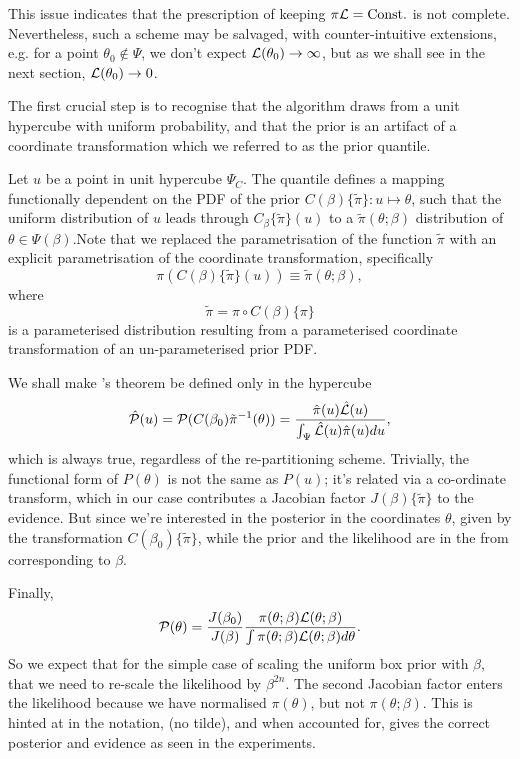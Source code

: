 \documentclass[usenatbib]{mnras}
\begin{document}
This issue indicates that the prescription of keeping \(\pi {\cal
	L} = \text{Const.}\) is not complete. Nevertheless, such a scheme
may be salvaged, with counter-intuitive extensions, e.g. for a
point \(\theta_{0} \notin \Psi\), we don't expect \({\cal
	L}(\theta_{0}) \rightarrow \infty\), but as we shall see in the
next section, \({\cal L}(\theta_{0}) \rightarrow 0\).

The first crucial step is to recognise that the algorithm draws
from a unit hypercube with uniform probability, and that the prior
is an artifact of a coordinate transformation which we referred to
as the prior quantile.

Let \(u\) be a point in unit hypercube \(\Psi_{C}\). The quantile
defines a mapping functionally dependent on the PDF of the prior
\(C(\beta)\lbrace \tilde{\pi}\rbrace:u \mapsto \theta\), such that
the uniform distribution of \(u\) leads through
\(C_{\beta}\{\tilde{\pi}\}(u)\) to a \(\tilde{\pi}(\theta;\beta)\)
distribution of \(\theta \in\Psi(\beta)\).Note that we replaced the
parametrisation of the function \(\tilde{\pi}\) with an explicit
parametrisation of the coordinate transformation, specifically
\begin{equation}
  \pi(C(\beta)\{\tilde{\pi}\}(u)) \equiv \tilde{\pi}(\theta; \beta),
\end{equation}
where 
\begin{equation}
  \tilde{\pi} =  \pi \circ C(\beta) \{ \pi \} 
\end{equation}
is a parameterised distribution resulting from a parameterised
coordinate transformation of an un-parameterised prior PDF.

We shall make \citeauthor{1763} 's theorem be defined only in the
hypercube
\begin{equation}
{\cal \hat{P}}(u) = {\cal P}(C(\beta_{0}){\tilde{\pi}}^{-1}(\theta)) = \frac{\hat{\pi} (u) {\cal \hat{L}}(u)}{\int_{\Psi}{\cal \hat{L}}(u) \hat{\pi}(u) du},
\end{equation}
which is always true, regardless of the re-partitioning
scheme. Trivially, the functional form of \(P(\theta)\) is not the same
as \(P(u)\); it's related via a co-ordinate transform, which in our
case contributes a Jacobian factor \(J(\beta)\{\tilde{\pi}\}\) to the
evidence. But since we're interested in the posterior in the
coordinates \(\theta\), given by the transformation \(C(\beta_{0})\{\tilde{\pi}\}\),
while the prior and the likelihood are in the from corresponding
to \(\beta\).

Finally, 
\begin{equation}
 {\cal P}(\theta) = \frac{J(\beta_{0})}{J(\beta)} \frac{\pi(\theta; \beta) {\cal L}(\theta; \beta)}{\int \pi(\theta; \beta) {\cal L}(\theta; \beta) d \theta}.
\end{equation}
So we expect that for the simple case of scaling the uniform box
prior with \(\beta\), that we need to re-scale the likelihood by
\(\beta^{2n}\). The second Jacobian factor enters the likelihood because
we have normalised \(\pi(\theta)\), but not \(\pi(\theta; \beta)\). This is hinted at in
the notation, (no tilde), and when accounted for, gives  the correct
posterior and evidence as seen in the experiments. 
\end{document}
